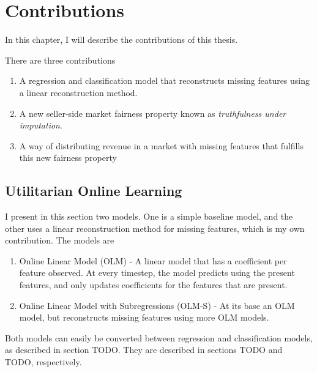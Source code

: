 \chapter{Contributions}


In this chapter, I will describe the contributions of this thesis.

There are three contributions
\begin{enumerate}
  \item A regression and classification model that reconstructs missing
    features using a linear reconstruction method.
  \item A new seller-side market fairness property known as \emph{truthfulness
    under imputation}.
  \item A way of distributing revenue in a market with missing features that
    fulfills this new fairness property 
\end{enumerate}
\section{Utilitarian Online Learning}
I present in this section two models. One is a simple baseline model, and the
other uses a linear reconstruction method for missing features, which is my own
contribution. The models are 
\begin{enumerate}
  \item Online Linear Model (OLM) - A linear model that has a coefficient per
    feature observed. At every timestep, the model predicts using the present
    features, and only updates coefficients for the features that are present.
  \item Online Linear Model with Subregressions (OLM-S) - At its base an OLM
    model, but reconstructs missing features using more OLM models.
\end{enumerate}
Both models can easily be converted between regression and classification
models, as described in section TODO. They are described in sections TODO and
TODO, respectively.

